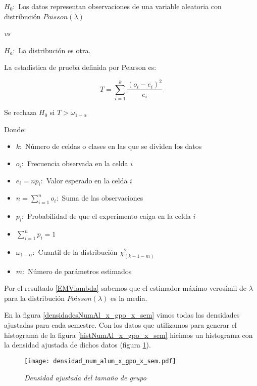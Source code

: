 $H_{0}: $ Los datos representan observaciones de una variable aleatoria con distribución $Poisson(\lambda)$

\textit{vs}

$H_{a}: $ La distribución es otra.


La estadística de prueba definida por Pearson es:

\begin{equation}
T = \displaystyle \sum_{i = 1}^{k} \dfrac{(\textit{o}_{i} - \textit{e}_{i})^{2}}{\textit{e}_{i}}
\end{equation}

Se rechaza $H_{0}$ si $T > \omega_{1-\alpha}$


Donde:

\begin{itemize}
\item[ ] $k:$ Número de celdas o clases en las que se dividen los datos

\item[ ] $\textit{o}_{i}:$ Frecuencia observada en la celda $i$

\item[ ] $\textit{e}_{i} = n p_{i}:$ Valor esperado  en la celda $i$

\item[ ] $n = \displaystyle \sum_{i = 1}^{n} o_{i}:$ Suma de las observaciones

\item[ ] $p_{i}:$ Probabilidad de que el experimento caiga en la celda $i$

\item[ ] $\displaystyle \sum_{i = 1}^{n} p_{i} = 1$

\item[ ] $\omega_{1-\alpha}:$ Cuantil de la distribución $\chi_{(k-1-m)}^{2}$

\item[ ] $m:$ Número de parámetros estimados %
\end{itemize}

Por el resultado \ref{EMVlambda} sabemos que el estimador máximo verosímil de $\lambda$ para la distribución $Poisson(\lambda)$ es la media.


En la figura \ref{densidadesNumAl_x_gpo_x_sem} vimos todas las densidades ajustadas para cada semestre. Con los datos que utilizamos para generar el histograma de la figura \ref{histNumAl_x_gpo_x_sem} hicimos un histograma con la densidad ajustada de dichos datos (figura \ref{densidad_tamGpo}).

\begin{figure}[H]
\centering
\texttt{[image: densidad\_num\_alum\_x\_gpo\_x\_sem.pdf]} %
\caption{\textit{Densidad ajustada del tamaño de grupo}}\label{densidad_tamGpo}
\end{figure}


